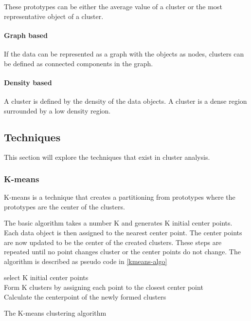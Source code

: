 These prototypes can be either the average value of a cluster or the most representative object of a cluster.

\paragraph{Graph based}
If the data can be represented as a graph with the objects as nodes, clusters can be defined as connected components in the graph.

\paragraph{Density based}
A cluster is defined by the density of the data objects.
A cluster is a dense region surrounded by a low density region.

\subsection{Techniques}

This section will explore the techniques that exist in cluster analysis.

\subsubsection{K-means}

K-means is a technique that creates a partitioning from prototypes where the prototypes are the center of the clusters.

The basic algorithm takes a number K and generates K initial center points.
Each data object is then assigned to the nearest center point.
The center points are now updated to be the center of the created clusters.
These steps are repeated until no point changes cluster or the center points do not change.
The algorithm is described as pseudo code in \cref{kmeans-algo}

\begin{algorithm}
\SetAlgoLined
{}

select K initial center points \\
 {
Form K clusters by assigning each point to the closest center point \\
Calculate the centerpoint of the newly formed clusters \label{recalculate}\\
}
\caption{The K-means clustering algorithm}\label{kmeans-algo}
\end{algorithm}

